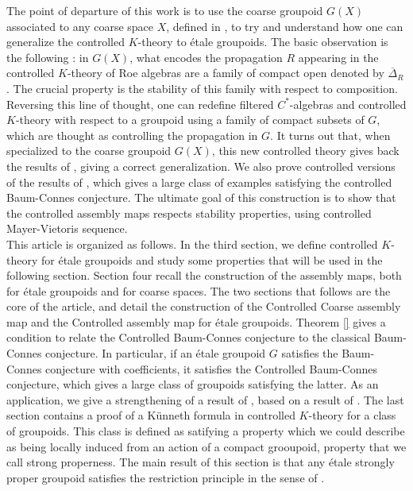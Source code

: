 The point of departure of this work is to use the coarse groupoid $G(X)$ associated to any coarse space $X$, defined in \cite{SkTuYu}, to try and understand how one can generalize the controlled $K$-theory to étale groupoids. The basic observation is the following : in $G(X)$, what encodes the propagation $R$ appearing in the controlled $K$-theory of Roe algebras are a family of compact open denoted by $\overline \Delta_R$. The crucial property is the stability of this family with respect to composition. Reversing this line of thought, one can redefine filtered $C^*$-algebras and controlled $K$-theory with respect to a groupoid using a family of compact subsets of $G$, which are thought as controlling the propagation in $G$. It turns out that, when specialized to the coarse groupoid $G(X)$, this new controlled theory gives back the results of \cite{OY2}, giving a correct generalization. We also prove controlled versions of the results of \cite{SkTuYu}, which gives a large class of examples satisfying the controlled Baum-Connes conjecture. The ultimate goal of this construction is to show that the controlled assembly maps respects stability properties, using controlled Mayer-Vietoris sequence.\\

This article is organized as follows. In the third section, we define controlled $K$-theory for étale groupoids and study some properties that will be used in the following section. Section four recall the construction of the assembly maps, both for étale groupoids and for coarse spaces. The two sections that follows are the core of the article, and detail the construction of the Controlled Coarse assembly map and the Controlled assembly map for étale groupoids. Theorem \ref{} gives a condition to relate the Controlled Baum-Connes conjecture to the classical Baum-Connes conjecture. In particular, if an étale groupoid $G$ satisfies the Baum-Connes conjecture with coefficients, it satisfies the Controlled Baum-Connes conjecture, which gives a large class of groupoids satisfying the latter. As an application, we give a strengthening of a result of \cite{OY2}, based on a result of \cite{FinnSellFibred}. The last section contains a proof of a Künneth formula in controlled $K$-theory for a class of groupoids. This class is defined as satifying a property which we could describe as being locally induced from an action of a compact grooupoid, property that we call strong properness. The main result of this section is that any étale strongly proper groupoid satisfies the restriction principle in the sense of \cite{ChabertEOY}.\\   

   
